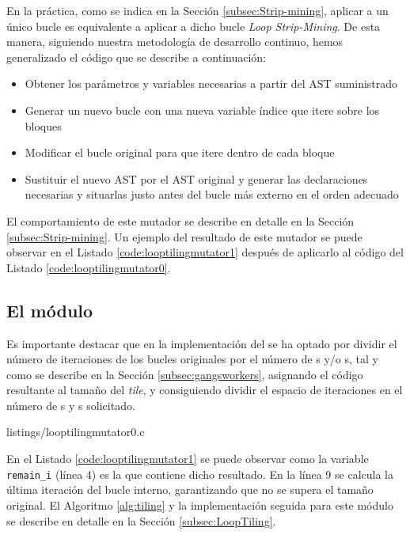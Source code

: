 En la práctica, como se indica en la Sección \ref{subsec:Strip-mining}, aplicar \tiling{} a un único 
bucle es equivalente a aplicar a dicho bucle \textit{Loop Strip-Mining}.
De esta manera, siguiendo nuestra metodología de desarrollo continuo, hemos generalizado 
el código que se describe a continuación:

\begin{itemize}
\item Obtener los parámetros y variables necesarias a partir del \ac{AST} suministrado
\item Generar un nuevo bucle con una nueva variable índice que itere sobre los bloques 
\item Modificar el bucle original para que itere dentro de cada bloque
\item Sustituir el nuevo \ac{AST} por el \ac{AST} original y generar las declaraciones 
necesarias y situarlas justo antes del bucle más externo en el orden adecuado
\end{itemize}

El comportamiento de este mutador se describe en detalle en la Sección \ref{subsec:Strip-mining}. Un ejemplo del resultado de este mutador se puede observar en el Listado \ref{code:looptilingmutator1}
después de aplicarlo al código del Listado \ref{code:looptilingmutator0}. 

\subsection{El módulo }
\label{subsubsec:looptilingmutator}


Es importante destacar que en la implementación del  se ha 
optado por dividir el número de iteraciones de los bucles originales por el número de 
\gang{}s y/o \worker{}s, tal y como se describe en la Sección \ref{subsec:gangsworkers},
asignando el código resultante al tamaño del \textit{tile}, y consiguiendo dividir el 
espacio de iteraciones en el número de \gang{}s y \worker{}s solicitado.


{listings/looptilingmutator0.c} %

En el Listado \ref{code:looptilingmutator1} se puede observar como la variable 
\texttt{remain\_i} (línea 4) es la que contiene dicho resultado. En la línea 9 se calcula 
la última iteración del bucle interno, garantizando que no se supera el tamaño original.
El Algoritmo \ref{alg:tiling} y la implementación seguida para este módulo se describe en 
detalle en la Sección \ref{subsec:LoopTiling}.

